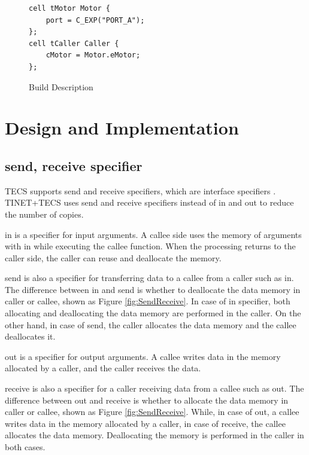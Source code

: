 \documentclass[conference]{IEEEtran/IEEEtran}
\begin{document}
\begin{description}
\begin{figure}[t]
\centering
\begin{lstlisting}
cell tMotor Motor {
    port = C_EXP("PORT_A");
};
cell tCaller Caller {
    cMotor = Motor.eMotor;
};
\end{lstlisting}
\caption{Build Description}
\label{build}
\end{figure}

\end{description}

\section{Design and Implementation}
\label{sec:Design and Implementation}

\subsection{send, receive specifier}

TECS supports send and receive specifiers, which are interface specifiers \cite{par:RPC}.
TINET+TECS uses send and receive specifiers instead of in and out to reduce the number of copies.

in is a specifier for input arguments.
A callee side uses the memory of arguments with in while executing the callee function.
When the processing returns to the caller side, the caller can reuse and deallocate the memory.

send is also a specifier for transferring data to a callee from a caller such as in.
The difference between in and send is whether to deallocate the data memory in caller or callee, shown as Figure \ref{fig:SendReceive}.
In case of in specifier, both allocating and deallocating the data memory are performed in the caller.
On the other hand, in case of send, the caller allocates the data memory and the callee deallocates it.

out is a specifier for output arguments.
A callee writes data in the memory allocated by a caller, and the caller receives the data.

receive is also a specifier for a caller receiving data from a callee such as out.
The difference between out and receive is whether to allocate the data memory in caller or callee, shown as Figure \ref{fig:SendReceive}.
While, in case of out, a callee writes data in the memory allocated by a caller, in case of receive, the callee allocates the data memory.
Deallocating the memory is performed in the caller in both cases.
\end{document}
